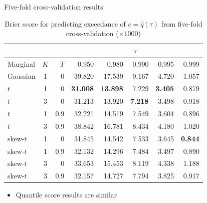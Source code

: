 \documentclass{beamer}
\begin{document}
\begin{frame}{Five-fold cross-validation results}
  \begin{table}[htbp]
    \small
    \centering
    \begin{tabular}{l|c|r|rrrrr}
          \multicolumn{3}{c}{\ } & \multicolumn{5}{c}{$\tau$}\\
           \hline
  Marginal & $K$ & $T$  & 0.950 & 0.980 & 0.990 & 0.995 & 0.999\\
  \hline
Gaussian 	& 1 & 0 	& 39.820 & 17.539 & 9.167 & 4.720 & 1.057\\
$t$		& 1 & 0 	& {\bf 31.008} & {\bf 13.898} & 7.229 & {\bf 3.405} & 0.879\\
$t$		& 3 & 0	& 31.213 & 13.920 & {\bf 7.218} & 3.498 & 0.918\\
$t$		& 1 & 0.9	& 32.221 & 14.519 & 7.549 & 3.604 & 0.896\\
$t$		& 3 & 0.9 	& 38.842 & 16.781 & 8.434 & 4.180 & 1.020\\
skew-$t$	& 1 & 0	& 31.845 & 14.542 & 7.533 & 3.645 & {\bf 0.844}\\
skew-$t$	& 1 & 0.9	& 32.132 & 14.296 & 7.484 & 3.497 & 0.890\\
skew-$t$	& 3 & 0	& 33.653 & 15.453 & 8.119 & 4.338 & 1.188\\
skew-$t$	& 3 & 0.9 	& 32.157 & 14.727 & 7.794 & 3.825 & 0.917\\
\hline
    \end{tabular}
    \caption{Brier score for predicting exceedance of $c = \hat{q}(\tau)$ from five-fold cross-validation ($\times 1000$)}
  \end{table} \vspace{-1.5em}
  \begin{itemize}
  	\item Quantile score results are similar
  \end{itemize}
\end{frame}
\end{document}
